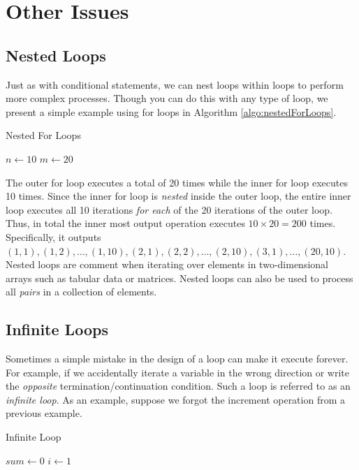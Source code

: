 \section{Other Issues}

\subsection{Nested Loops}

Just as with conditional statements, we can nest loops within loops to perform
more complex processes.  Though you can do this with any type of loop, we 
present a simple example using for loops in Algorithm \ref{algo:nestedForLoops}.

\begin{algorithm}[h]
\caption{Nested For Loops}
\label{algo:nestedForLoops}
$n \leftarrow 10$ \;
$m \leftarrow 20$ \;
\end{algorithm}

The outer for loop executes a total of 20 times while the inner for loop 
executes 10 times.  Since the inner for loop is \emph{nested} inside the 
outer loop, the entire inner loop executes all 10 iterations \emph{for each}
of the 20 iterations of the outer loop.  Thus, in total the inner most output
operation executes $10 \times 20 = 200$ times.  Specifically, it outputs 
$(1, 1), (1, 2), \ldots, (1, 10), (2, 1), (2, 2), \ldots, (2, 10), (3, 1), \ldots, (20, 10)$.  Nested loops are comment when iterating over elements 
in two-dimensional 
arrays such as tabular data or matrices.  Nested loops can also be used 
to process all \emph{pairs} in a collection of elements.

\subsection{Infinite Loops}
\label{subsection:infiniteLoops}

Sometimes a simple mistake in the design of a loop can make it execute forever.  
For example, if we accidentally iterate a variable in the wrong direction or write the
\emph{opposite} termination/continuation condition.  Such a loop is referred to as 
an \emph{infinite loop}.  As an example, suppose we forgot the increment operation
from a previous example.

\begin{algorithm}[h]
\caption{Infinite Loop}
\label{algo:infiniteLoop}
$sum \leftarrow 0$ \;
$i \leftarrow 1$ \;
\end{algorithm}

